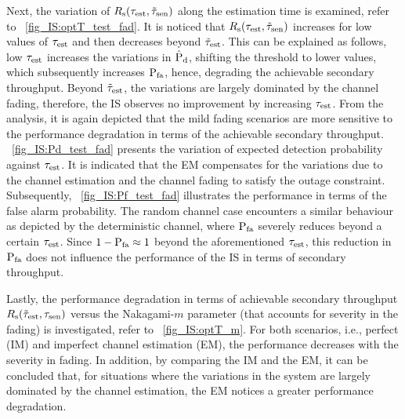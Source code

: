 {Next, the variation of $R_{\text{s}}(\tau_{\text{est}}, \tilde{\tau}_{\text{sen}})$ along the estimation time is examined, refer to \figurename~\ref{fig_IS:optT_test_fad}. It is noticed that $R_{\text{s}}(\tau_{\text{est}}, \tilde{\tau}_{\text{sen}})$ increases for low values of $\tau_{\text{est}}$ and then decreases beyond $\tilde{\tau}_{\text{est}}$. This can be explained as follows, low $\tau_{\text{est}}$ increases the variations in $\hat{\text{P}}_{\text{d}}$, shifting the threshold to lower values, which subsequently increases $\text{P}_{\text{fa}}$, hence, degrading the achievable secondary throughput. Beyond $\tilde{\tau}_{\text{est}}$, the variations are largely dominated by the channel fading, therefore, the IS observes no improvement by increasing $\tau_{\text{est}}$. From the analysis, it is again depicted that the mild fading scenarios are more sensitive to the performance degradation in terms of the achievable secondary throughput. \figurename~\ref{fig_IS:Pd_test_fad} presents the variation of expected detection probability against $\tau_{\text{est}}$. It is indicated that the EM compensates for the variations due to the channel estimation and the channel fading to satisfy the outage constraint. Subsequently, \figurename~\ref{fig_IS:Pf_test_fad} illustrates the performance in terms of the false alarm probability. The random channel case encounters a similar behaviour as depicted by the deterministic channel, where $\text{P}_{\text{fa}}$ severely reduces beyond a certain $\tau_{\text{est}}$. Since $1 - \text{P}_{\text{fa}} \approx 1$ beyond the aforementioned $\tau_{\text{est}}$, this reduction in $\text{P}_{\text{fa}}$ does not influence the performance of the IS in terms of secondary throughput.  

Lastly, the performance degradation in terms of achievable secondary throughput $R_{\text{s}}(\tilde{\tau}_{\text{est}}, \tau_{\text{sen}})$ versus the Nakagami-$m$ parameter (that accounts for severity in the fading) is investigated, refer to \figurename~\ref{fig_IS:optT_m}. For both scenarios, i.e., perfect (IM) and imperfect channel estimation (EM), the performance decreases with the severity in fading. In addition, by comparing the IM and the EM, it can be concluded that, for situations where the variations in the system are largely dominated by the channel estimation, the EM notices a greater performance degradation.


}
